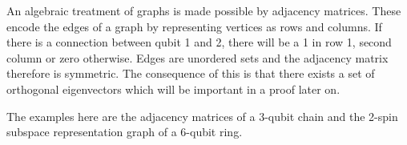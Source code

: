 \begin{center}
\end{center}

\noindent An algebraic treatment of graphs is made possible by adjacency matrices. These encode the edges of a graph by representing vertices as rows and columns. If there is a connection between qubit 1 and 2, there will be a 1 in row 1, second column or zero  otherwise. Edges are unordered sets and the adjacency matrix therefore is symmetric. The consequence of this is that there exists a set of orthogonal eigenvectors which will be important in a proof later on.\par
The examples here are the adjacency matrices of a 3-qubit chain and the 2-spin subspace representation graph of a 6-qubit ring.


